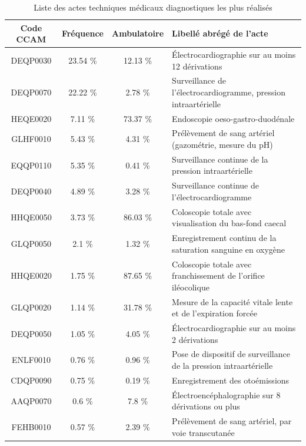 \begin{table}[!b]
\centering
\caption{Liste des actes techniques médicaux diagnostiques les plus réalisés} 
\label{liste2}
\begin{tabular}{c|ccl}
  \hline
Code CCAM & Fréquence & Ambulatoire & Libellé abrégé de l'acte \\ 
  \hline
DEQP0030 & 23.54 \% & 12.13 \% & Électrocardiographie sur au moins 12 dérivations \\ 
  DEQP0070 & 22.22 \% & 2.78 \% & Surveillance de l'électrocardiogramme, pression intraartérielle\\ 
  HEQE0020 & 7.11 \% & 73.37 \% & Endoscopie oeso-gastro-duodénale \\ 
  GLHF0010 & 5.43 \% & 4.31 \% & Prélèvement de sang artériel (gazométrie, mesure du pH) \\ 
  EQQP0110 & 5.35 \% & 0.41 \% & Surveillance continue de la pression intraartérielle \\ 
  DEQP0040 & 4.89 \% & 3.28 \% & Surveillance continue de l'électrocardiogramme \\ 
  HHQE0050 & 3.73 \% & 86.03 \% & Coloscopie totale avec visualisation du bas-fond caecal \\ 
  GLQP0050 & 2.1 \% & 1.32 \% & Enregistrement continu de la saturation sanguine en oxygène \\ 
  HHQE0020 & 1.75 \% & 87.65 \% & Coloscopie totale avec franchissement de l'orifice iléocolique \\ 
  GLQP0020 & 1.14 \% & 31.78 \% & Mesure de la capacité vitale lente et de l'expiration forcée \\ 
  DEQP0050 & 1.05 \% & 4.05 \% & Électrocardiographie sur au moins 2 dérivations \\ 
  ENLF0010 & 0.76 \% & 0.96 \% & Pose de dispositif de surveillance de la pression intraartérielle \\ 
  CDQP0090 & 0.75 \% & 0.19 \% & Enregistrement des otoémissions \\ 
  AAQP0070 & 0.6 \% & 7.8 \% & Électroencéphalographie sur 8 dérivations ou plus \\ 
  FEHB0010 & 0.57 \% & 2.39 \% & Prélèvement de sang artériel, par voie transcutanée \\ 
   \hline
\end{tabular}
\end{table}



